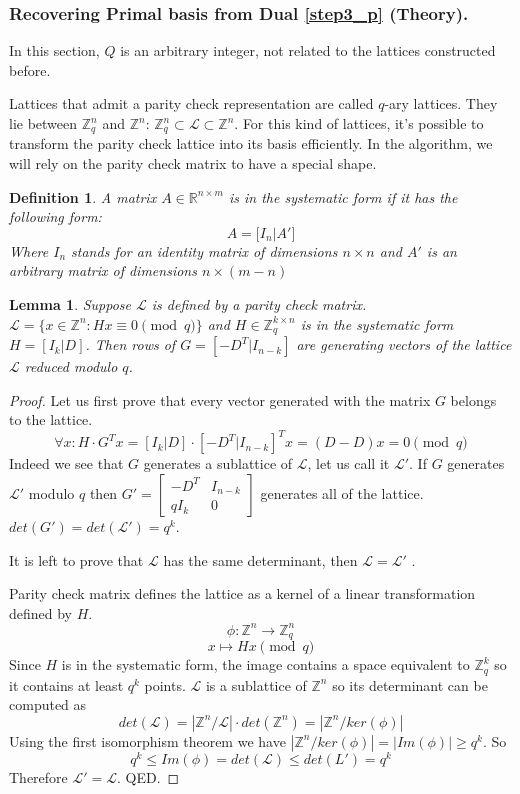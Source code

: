 \documentclass[12pt]{article}
\newcommand{\ZZ}{\mathbb{Z}}
\newcommand{\LL}{\mathcal{L}}
\newtheorem{lemma}{Lemma}
\newtheorem{definition}{Definition}
\begin{document}
\subsubsection{Recovering Primal basis from Dual \ref{step3_p} (Theory).}
\label{subsubsec:primal_from_dual_t_polynomials}

In this section, $Q$ is an arbitrary integer, not related to the lattices constructed before.

Lattices that admit a parity check representation are called $q$-ary lattices. They lie between $\ZZ^{n}_{q}$ and $\ZZ^{n}$: $\ZZ^{n}_{q}  \subset \LL \subset \ZZ^{n}$. For this kind of lattices, it's possible to transform the parity check lattice into its basis efficiently. In the algorithm, we will rely on the parity check matrix to have a special shape.
\begin{definition}
A matrix $A \in \mathbb{R}^{n \times m}$ is in the systematic form if it has the following form:
\[
A = \big[ I_{n} | A' \big]
\]
Where $I_{n}$ stands for an identity matrix of dimensions $n \times n$ and $A'$ is an arbitrary matrix of dimensions $n \times (m-n)$
\end{definition}

\begin{lemma}\label{coolfact}
    Suppose $\LL$ is defined by a parity check matrix. $\LL = \{x \in \ZZ^{n}: Hx \equiv 0 \pmod{q}\}$ and $H \in \ZZ_{q}^{k \times n}$ is in the systematic form $H = [I_{k}| D]$. Then rows of $G = [-D^{T}| I_{n-k}]$ are generating vectors of the lattice $\LL$ reduced modulo $q$.
\end{lemma}
\begin{proof}
Let us first prove that every vector generated with the matrix $G$ belongs to the lattice.
\[
\forall x: H \cdot G^{T}x = [I_{k}|D] \cdot [-D^{T}| I_{n-k}]^{T}x = (D - D)x = 0 \pmod{q}
\]
Indeed we see that $G$ generates a sublattice of $\LL$, let us call it $\LL'$. If $G$ generates $\LL'$ modulo $q$ then
$
G' = \left[ \begin{array}{c|c} -D^{T} & I_{n-k} \\ \hline qI_k & 0 \end{array}\right]
$
generates all of the lattice. $det(G') = det(\LL') = q^{k}$.

It is left to prove that $\LL$ has the same determinant, then $\LL= \LL'$ .

Parity check matrix defines the lattice as a kernel of a linear transformation defined by $H$.
\[
    \phi: \ZZ^{n} \rightarrow \ZZ_q^{n}
\]
\[
    x \mapsto Hx \pmod{q}
\]
Since $H$ is in the systematic form, the image contains a space equivalent to $\ZZ_{q}^{k}$ so it contains at least $q^{k}$ points. $\LL$ is a sublattice of $\ZZ^{n}$ so its determinant can be computed as
\[
    det(\LL) = |\ZZ^{n}/\LL| \cdot det(\ZZ^{n}) = |\ZZ^{n}/ker(\phi)|
\]
Using the first isomorphism theorem we have $|\ZZ^{n}/ker(\phi)| = |Im(\phi)| \geq q^{k}$. So
\[
    q^{k} \leq Im(\phi) = det(\LL) \leq det(L') = q^{k}
\]
Therefore $\LL' = \LL$. QED.
\end{proof}
\end{document}

